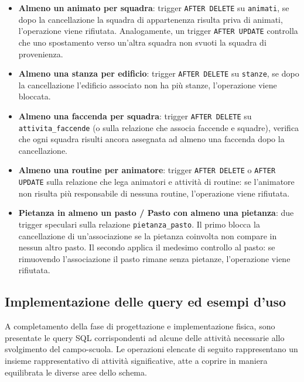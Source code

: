 \documentclass[11pt,a4paper]{article}
\begin{document}
\begin{itemize}[nosep]
    supervisore di un pasto, ricostruisce, mediante una sequenza di \texttt{JOIN}, la relazione tra
    pasto, pietanze e allergeni confrontando con le allergie registrate per quel cuoco. Se
    l'intersezione non è vuota, l'assegnazione viene bloccata.
  \item \textbf{Almeno un animato per squadra}: trigger \texttt{AFTER DELETE} su
    \texttt{animati}, se dopo la cancellazione la squadra di appartenenza risulta priva di
    animati, l'operazione viene rifiutata. Analogamente, un trigger \texttt{AFTER UPDATE}
    controlla che uno spostamento verso un'altra squadra non svuoti la squadra di provenienza.
  \item \textbf{Almeno una stanza per edificio}: trigger \texttt{AFTER DELETE} su
    \texttt{stanze}, se dopo la cancellazione l'edificio associato non ha più stanze,
    l'operazione viene bloccata.
  \item \textbf{Almeno una faccenda per squadra}: trigger \texttt{AFTER DELETE} su
    \texttt{attivita\_faccende} (o sulla relazione che associa faccende e squadre), verifica che
    ogni squadra risulti ancora assegnata ad almeno una faccenda dopo la cancellazione.
  \item \textbf{Almeno una routine per animatore}: trigger \texttt{AFTER DELETE} o
    \texttt{AFTER UPDATE} sulla relazione che lega animatori e attività di routine: se
    l'animatore non risulta più responsabile di nessuna routine, l'operazione viene rifiutata.
  \item \textbf{Pietanza in almeno un pasto / Pasto con almeno una pietanza}: due trigger
    speculari sulla relazione \texttt{pietanza\_pasto}. Il primo blocca la cancellazione di
    un'associazione se la pietanza coinvolta non compare in nessun altro pasto. Il secondo
    applica il medesimo controllo al pasto: se rimuovendo l'associazione il pasto rimane senza
    pietanze, l'operazione viene rifiutata.
\end{itemize}

\subsection{Implementazione delle query ed esempi d'uso}

A completamento della fase di progettazione e implementazione fisica, sono presentate le query
SQL corrispondenti ad alcune delle attività necessarie allo svolgimento del campo-scuola. Le
operazioni elencate di seguito rappresentano un insieme rappresentativo di attività
significative, atte a coprire in maniera equilibrata le diverse aree dello schema.
\end{document}
